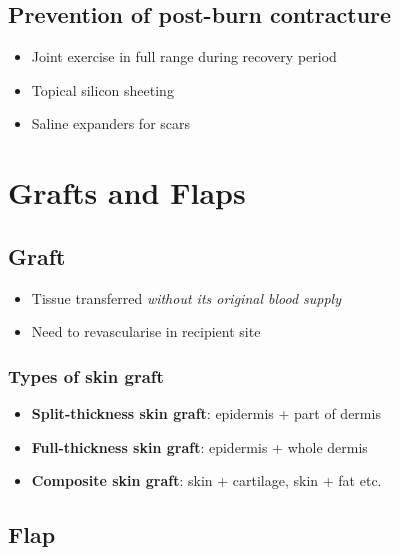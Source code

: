 \documentclass[
  12pt,
]{memoir}
\providecommand{\tightlist}{%
  \setlength{\itemsep}{0pt}\setlength{\parskip}{0pt}}
\begin{document}
\hypertarget{prevention-of-post-burn-contracture}{%
\section{Prevention of post-burn
contracture}\label{prevention-of-post-burn-contracture}}

\begin{itemize}
\tightlist
\item
  Joint exercise in full range during recovery period
\item
  Topical silicon sheeting
\item
  Saline expanders for scars
\end{itemize}

\pagebreak

\hypertarget{grafts-and-flaps}{%
\chapter{Grafts and Flaps}\label{grafts-and-flaps}}

\hypertarget{graft}{%
\section{Graft}\label{graft}}

\begin{itemize}
\tightlist
\item
  Tissue transferred \emph{without its original blood supply}
\item
  Need to revascularise in recipient site
\end{itemize}

\hypertarget{types-of-skin-graft}{%
\subsection{Types of skin graft}\label{types-of-skin-graft}}

\begin{itemize}
\tightlist
\item
  \textbf{Split-thickness skin graft}: epidermis + part of dermis
\item
  \textbf{Full-thickness skin graft}: epidermis + whole dermis
\item
  \textbf{Composite skin graft}: skin + cartilage, skin + fat etc.
\end{itemize}

\hypertarget{flap}{%
\section{Flap}\label{flap}}
\end{document}
